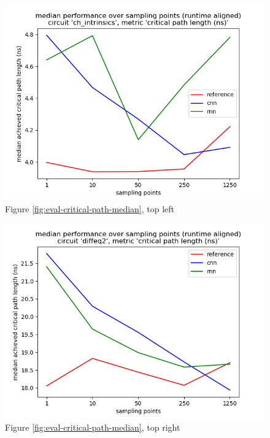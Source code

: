 \begin{figure}[H]
	\includegraphics[width=\linewidth]{plots/eval-ch_intrinsics-critical-path-median-full.png}
	\caption{Figure \ref{fig:eval-critical-path-median}, top left}
\end{figure}

\begin{figure}[H]
	\includegraphics[width=\linewidth]{plots/eval-diffeq2-critical-path-median-full.png}
	\caption{Figure \ref{fig:eval-critical-path-median}, top right}
\end{figure}

